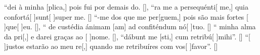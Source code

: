 {    {``dei à minha [plica,] pois fui por demais \-do. [\LinkPT]},
  {``ra me a persequénti[ me,] quia confortá[ ]{sunt}[ ]{su}per me. [\LinkLA]}%
    {``-me dos que me per[guem,] pois são mais fortes [ ]{que}[ ]{eu}. [\LinkPT]},
  {`` de custédia ánimam [am] ad confitén\-dum nó[ ]{tu}o. [\LinkLA]}%
    {`` minha alma da pri[,] e darei graças ao [ ]{no}me. [\LinkPT]},
  {``dábunt me [sti,] cum retribú[ ]{mi}hi''.
      [\LinkLA]}%
    {``[ ]{jus}tos estarão ao meu re[,] quando me retribuíres com vos[ ]{fa}{vor}''. [\LinkPT]}
}